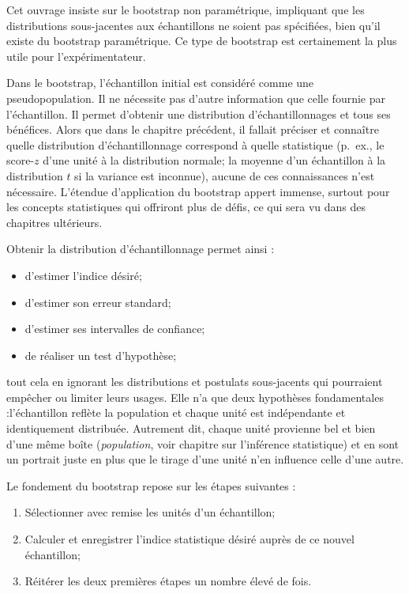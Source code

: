 \documentclass[
]{book}
\begin{document}
Cet ouvrage insiste sur le bootstrap non paramétrique, impliquant que les distributions sous-jacentes aux échantillons ne soient pas spécifiées, bien qu'il existe du bootstrap paramétrique. Ce type de bootstrap est certainement la plus utile pour l'expérimentateur.

Dans le bootstrap, l'échantillon initial est considéré comme une pseudopopulation. Il ne nécessite pas d'autre information que celle fournie par l'échantillon. Il permet d'obtenir une distribution d'échantillonnages et tous ses bénéfices. Alors que dans le chapitre précédent, il fallait préciser et connaître quelle distribution d'échantillonnage correspond à quelle statistique (p.~ex., le score-\(z\) d'une unité à la distribution normale; la moyenne d'un échantillon à la distribution \(t\) si la variance est inconnue), aucune de ces connaissances n'est nécessaire. L'étendue d'application du bootstrap appert immense, surtout pour les concepts statistiques qui offriront plus de défis, ce qui sera vu dans des chapitres ultérieurs.

Obtenir la distribution d'échantillonnage permet ainsi :

\begin{itemize}
\item
  d'estimer l'indice désiré;
\item
  d'estimer son erreur standard;
\item
  d'estimer ses intervalles de confiance;
\item
  de réaliser un test d'hypothèse;
\end{itemize}

tout cela en ignorant les distributions et postulats sous-jacents qui pourraient empêcher ou limiter leurs usages. Elle n'a que deux hypothèses fondamentales :l'échantillon reflète la population et chaque unité est indépendante et identiquement distribuée. Autrement dit, chaque unité provienne bel et bien d'une même boîte (\emph{population}, voir chapitre sur l'inférence statistique) et en sont un portrait juste en plus que le tirage d'une unité n'en influence celle d'une autre.

Le fondement du bootstrap repose sur les étapes suivantes :

\begin{enumerate}
\def\labelenumi{\arabic{enumi}.}
\item
  Sélectionner avec remise les unités d'un échantillon;
\item
  Calculer et enregistrer l'indice statistique désiré auprès de ce nouvel échantillon;
\item
  Réitérer les deux premières étapes un nombre élevé de fois.
\end{enumerate}
\end{document}

